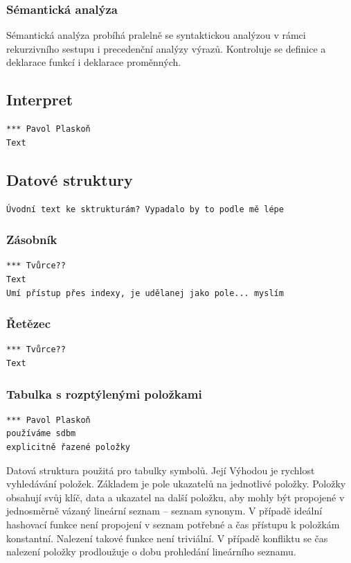 \documentclass[a4paper, 12pt]{article}
\begin{document}
\subsubsection{Sémantická analýza}
Sémantická analýza probíhá pralelně se syntaktickou analýzou v rámci
rekurzivního sestupu i precedenční analýzy výrazů. Kontroluje se definice
a deklarace funkcí i deklarace proměnných.

\subsection{Interpret} \label{interpret}

\begin{verbatim}
*** Pavol Plaskoň
Text
\end{verbatim}
\subsection{Datové struktury}

\begin{verbatim}
Úvodní text ke sktrukturám? Vypadalo by to podle mě lépe
\end{verbatim}

\subsubsection{Zásobník}
\begin{verbatim}
*** Tvůrce??
Text
Umí přístup přes indexy, je udělanej jako pole... myslím
\end{verbatim}

\subsubsection{Řetězec}
\begin{verbatim}
*** Tvůrce??
Text
\end{verbatim}

\subsubsection{Tabulka s rozptýlenými položkami}
\begin{verbatim}
*** Pavol Plaskoň
používáme sdbm
explicitně řazené položky
\end{verbatim}
Datová struktura použitá pro tabulky symbolů. Její Výhodou je rychlost vyhledávání
položek. Základem je pole ukazatelů na
jednotlivé položky. Položky obsahují svůj klíč, data a ukazatel na další
položku, aby mohly být propojené v jednosměrně vázaný lineární
seznam -- seznam synonym. V případě ideální hashovací funkce není propojení v
seznam potřebné a čas přístupu k položkám konstantní. Nalezení takové
funkce není triviální. V případě konfliktu se čas nalezení položky
prodloužuje o dobu prohledání lineárního seznamu.
\end{document}

